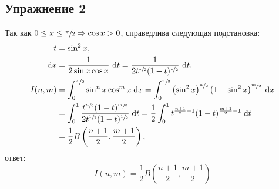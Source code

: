 \def \picdir{pic/}

\subsection*{Упражнение 2}
Так как $0 \le x \le \sfrac{\pi}{2} \Rightarrow \cos{x} > 0$, справедлива следующая подстановка:
\begin{align*}
  t &= \sin^2{x},\\
  \mathrm{d} x &= \frac{1}{2\sin{x}\cos{x}}\ \mathrm{d} t = \frac{1}{2t^{\sfrac{1}{2}}(1-t)^{\sfrac{1}{2}}}\ \mathrm{d} t,\\
  I(n,m) &= \int_{0}^{\sfrac{\pi}{2}} \sin^n{x}\cos^m{x}\; \mathrm{d} x = \int_{0}^{\sfrac{\pi}{2}} \left(\sin^2{x}\right)^{\sfrac{n}{2}} \left(1-\sin^2{x}\right)^{\sfrac{m}{2}}\; \mathrm{d} x\\
    &= \int_{0}^{1} \frac{t^{\sfrac{n}{2}} (1-t)^{\sfrac{m}{2}}}{2t^{\sfrac{1}{2}}(1-t)^{\sfrac{1}{2}}}\; \mathrm{d} t = \frac{1}{2}\int_{0}^{1} t^{\frac{n+1}{2} - 1}(1-t)^{\frac{m+1}{2} - 1}\; \mathrm{d} t\\
    &= \frac{1}{2} B\left(\frac{n+1}{2}, \frac{m+1}{2}\right),
\end{align*}
ответ:
\begin{equation*}
\boxed{I(n,m) = \frac{1}{2} B\left(\frac{n+1}{2}, \frac{m+1}{2}\right)}
\end{equation*}

